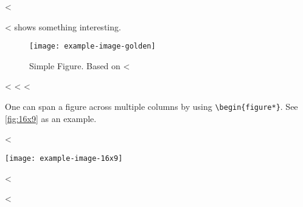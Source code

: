 <%

<%
 shows something interesting.

\begin{figure}
  \centering
  \texttt{[image: example-image-golden]}
  \caption[Simple Figure]{
    Simple Figure.
    Based on <%
  }
  \label{fig:label}
\end{figure}
<%
<%
<%

One can span a figure across multiple columns by using \verb+\begin{figure*}+.
See \cref{fig:16x9} as an example.

<%
\begin{figure*}
  \centering
  \texttt{[image: example-image-16x9]}
  \caption{16x9 Figure}
  \label{fig:16x9}
\end{figure*}
<%

<%
